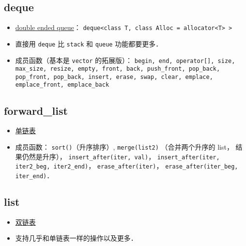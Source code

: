 \subsection{deque}
\begin{itemize}
\item \href{https://cplusplus.com/reference/deque/deque/}{double ended queue}： \verb|deque<class T, class Alloc = allocator<T> >|
\item 直接用 \verb|deque| 比 \verb|stack| 和 \verb|queue| 功能都要更多．
\item 成员函数（基本是 \verb|vector| 的拓展版）： \verb|begin, end, operator[], size, max_size, resize, empty, front, back, push_front, pop_back, pop_front, pop_back, insert, erase, swap, clear, emplace, emplace_front, emplace_back|
\end{itemize}

\subsection{forward_list}
\begin{itemize}
\item \href{https://cplusplus.com/reference/forward_list/forward_list/}{单链表}
\item 成员函数： \verb|sort()|（升序排序）, \verb|merge(list2)| （合并两个升序的 list， 结果仍然是升序）， \verb|insert_after(iter, val)|，  \verb|insert_after(iter, iter2_beg, iter2_end)|， \verb|erase_after(iter)|， \verb|erase_after(iter_beg, iter_end)|．
\end{itemize}

\subsection{list}
\begin{itemize}
\item \href{https://cplusplus.com/reference/list/list/}{双链表}
\item 支持几乎和单链表一样的操作以及更多．
\end{itemize}
